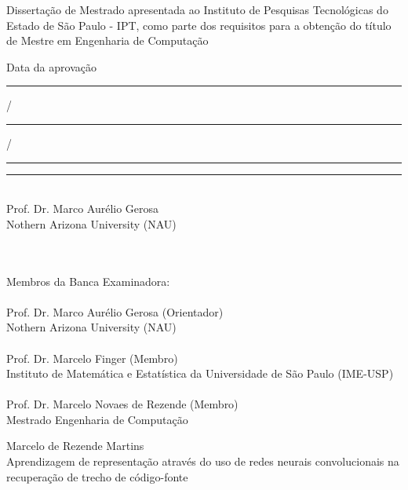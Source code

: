\documentclass[12pt,twoside,a4paper]{book} %
\begin{document}
    \vskip 2cm

    \hspace{6cm}\begin{minipage}{0.48\linewidth}
	Dissertação de Mestrado apresentada
	ao Instituto de Pesquisas Tecnológicas do\\
	Estado de São Paulo - IPT, como 
	parte dos requisitos para a obtenção do 
	título de Mestre em Engenharia de 
	Computação
    \end{minipage}
    
    \vskip 2cm
    
    \hspace{6cm}\begin{minipage}{0.48\linewidth}
	Data da aprovação \rule{0.7cm}{0.4pt}/\rule{0.7cm}{0.4pt}/\rule{1.4cm}{0.4pt}
    \end{minipage}
    
    \vskip 2cm
    
    \hspace{6cm}\begin{minipage}{0.48\linewidth}
	\rule{7cm}{0.4pt}\\
	Prof. Dr. Marco Aurélio Gerosa\\
	Nothern Arizona University (NAU)\\
    \end{minipage}
\\
\\
Membros da Banca Examinadora:\\ 
\\
Prof. Dr. Marco Aurélio Gerosa (Orientador)\\
Nothern Arizona University (NAU)\\
\\
Prof. Dr. Marcelo Finger (Membro)\\
Instituto de Matemática e Estatística da Universidade de São Paulo (IME-USP)\\
\\
Prof. Dr. Marcelo Novaes de Rezende (Membro)\\
Mestrado Engenharia de Computação\\


\pagebreak


%
%
%
%
\newpage
\thispagestyle{empty}
    \begin{center}
        Marcelo de Rezende Martins\\
        \vspace*{2.3 cm}
        Aprendizagem de representação através do uso de redes neurais convolucionais na recuperação de trecho de código-fonte\\
        \vspace*{2 cm}
    \end{center}
\end{document}
